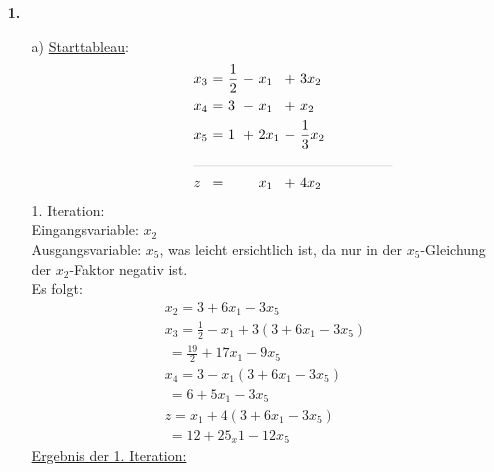 \documentclass [a4paper,11pt]{article}
\author{\authorinfotitle}
\title{\titleinfo}
\date{\today}
\begin{document}
\maketitle
    \begin{enumerate}
        \item[\textbf{1.}]
        \begin{enumerate}
            \item[a)]
                \underline{Starttableau}:
                \begin{align*}
                \begin{alignedat}{6}
                & x_3 &\ = &\ \frac{1}{2} &\ - &\  x_1 &\ + &\           3x_2 \\
                & x_4 &\ = &\           3 &\ - &\  x_1 &\ + &\            x_2 \\
                & x_5 &\ = &\           1 &\ + &\ 2x_1 &\ - &\ \frac{1}{3}x_2 \\
                &\rlap{\rule{5cm}{.1pt}} &&&&&&\\
                & z   &\ = &              &    &\  x_1 &\ + &\  4x_2
                \end{alignedat}
                \end{align*}
                1. Iteration:\\
                Eingangsvariable: $x_2$\\
                Ausgangsvariable: $x_5$, was leicht ersichtlich ist, da nur in der $x_5$-Gleichung der $x_2$-Faktor negativ ist.\\
                Es folgt:
                \begin{align*}
                    & x_2 = 3 + 6x_1 - 3x_5\\
                    & x_3 = \frac{1}{2} - x_1 + 3 \left( 3 + 6x_1 - 3x_5 \right)\\
                    &   \ = \frac{19}{2} +17x_1 - 9x_5\\
                    & x_4 = 3 - x_1 \left( 3 + 6x_1 - 3x_5 \right)\\
                    &   \ = 6 + 5x_1 - 3x_5\\
                    &   z = x_1 + 4 \left( 3 + 6x_1 - 3x_5 \right)\\
                    &   \ = 12 + 25_x1 - 12x_5
                \end{align*}
                \underline{Ergebnis der 1. Iteration:}
                \begin{align*}
                \begin{alignedat}{6}

\end{alignedat}
\end{align*}
\end{enumerate}
\end{enumerate}
\end{document}
